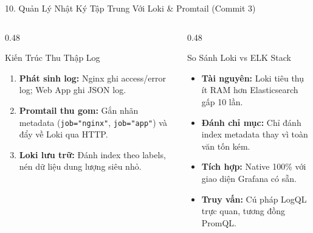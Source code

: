 \documentclass[aspectratio=169,10pt]{beamer}
\begin{document}
\begin{frame}{10. Quản Lý Nhật Ký Tập Trung Với Loki \& Promtail (Commit 3)}
    \begin{columns}[T]
        \begin{column}{0.48\textwidth}
            \begin{block}{Kiến Trúc Thu Thập Log}
                \begin{enumerate}
                    \item \textbf{Phát sinh log:} Nginx ghi access/error log; Web App ghi JSON log.
                    \item \textbf{Promtail thu gom:} Gắn nhãn metadata (\texttt{job="nginx"}, \texttt{job="app"}) và đẩy về Loki qua HTTP.
                    \item \textbf{Loki lưu trữ:} Đánh index theo labels, nén dữ liệu dung lượng siêu nhỏ.
                \end{enumerate}
            \end{block}
        \end{column}

        \begin{column}{0.48\textwidth}
            \begin{exampleblock}{So Sánh Loki vs ELK Stack}
                \begin{itemize}
                    \item \textbf{Tài nguyên:} Loki tiêu thụ ít RAM hơn Elasticsearch gấp 10 lần.
                    \item \textbf{Đánh chỉ mục:} Chỉ đánh index metadata thay vì toàn văn tốn kém.
                    \item \textbf{Tích hợp:} Native 100\% với giao diện Grafana có sẵn.
                    \item \textbf{Truy vấn:} Cú pháp LogQL trực quan, tương đồng PromQL.
                \end{itemize}
            \end{exampleblock}
        \end{column}
    \end{columns}
\end{frame}
\end{document}

